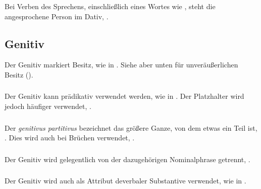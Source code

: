 \subsubsection{} Bei Verben des Sprechens, einschließlich eines Wortes wie  , steht die angesprochene Person im Dativ,  .

\subsection{Genitiv} Der Genitiv markiert Besitz, wie in  . Siehe aber unten für unveräußerlichen Besitz ().

\subsubsection{} Der Genitiv kann prädikativ verwendet werden, wie in  . Der Platzhalter   wird jedoch häufiger verwendet,  . \label{syn:pum:genitive}

\subsubsection{} Der \textit{genitivus partitivus} bezeichnet das größere Ganze, von dem etwas ein Teil ist,  . Dies wird auch bei Brüchen verwendet,  . 
\label{syn:partitive-gen}

\subsubsection{} Der Genitiv wird gelegentlich von der dazugehörigen Nominalphrase getrennt,  .

\subsubsection{} Der Genitiv wird auch als Attribut deverbaler Substantive verwendet, wie in  .

